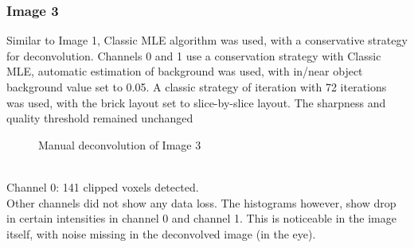 \documentclass{article}
\begin{document}
\subsubsection*{Image 3} \newline
Similar to Image 1, Classic MLE algorithm was used, with a conservative strategy for deconvolution. 
Channels 0 and 1 use a conservation strategy with Classic MLE, automatic estimation of background was used, with in/near object background value set to 0.05. A classic strategy of iteration with 72 iterations was used, with the brick layout set to slice-by-slice layout. The sharpness and quality threshold remained unchanged \newline
\begin{figure}[h!]
\centering
{}
\vspace{5 mm}
\caption{Manual deconvolution of Image 3}
\label{fig:manual-deconvolve-image3}
\end{figure}
\\ 
Channel 0: 141 clipped voxels detected.\\ Other channels did not show any data loss. The histograms however, show drop in certain intensities in channel 0 and channel 1. This is noticeable in the image itself, with noise missing in the deconvolved image (in the eye). 
\end{document}

